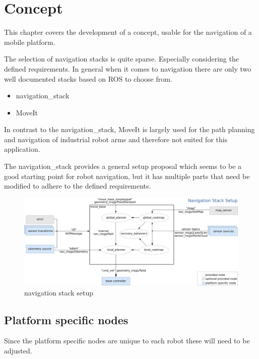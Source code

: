 \chapter{Concept}
\label{Concept}

This chapter covers the development of a concept, usable for the navigation of a mobile platform. 


The selection of navigation stacks is quite sparse. Especially considering the defined requirements. In general when it comes to navigation there are only two well documented stacks based on ROS to choose from.

\begin{itemize}
	\item navigation\_stack
	\item MoveIt
\end{itemize}

In contrast to the navigation\_stack, MoveIt is largely used for the path planning and navigation of industrial robot arms and therefore not suited for this application.

The navigation\_stack provides a general setup proposal which seems to be a good starting point for robot navigation, but it has multiple parts that need be modified to adhere to the defined requirements.

\begin{figure}[H]
	\centering
	\includegraphics[width=\textwidth]{Pictures/navigation stack setup}
	\caption{navigation stack setup\cite{movebase}}
	
	\label{navigation stack setup}
\end{figure}


\section{Platform specific nodes}
Since the platform specific nodes are unique to each robot these will need to be adjusted.\\
